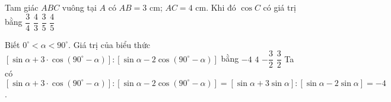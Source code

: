 \begin{ex}%
	Tam giác $ABC$ vuông tại $A$ có $AB=3$ cm; $AC=4$ cm. Khi đó $\cos C$ có giá trị bằng
	\choice
	{$\dfrac{3}{4}$}
	{$\dfrac{4}{3}$}
	{$\dfrac{3}{5}$}
	{\True $\dfrac{4}{5}$}
	\loigiai
	{ 
	}
\end{ex}

\begin{ex}%
	Biết $0^\circ< \alpha < 90^\circ$. Giá trị của biểu thức $\left[\sin \alpha +3\cdot \cos (90^\circ-\alpha)\right]:\left[\sin \alpha -2 \cos(90^\circ -\alpha)\right]$ bằng 
	\choice
	{\True $-4$}
	{$4$}
	{$-\dfrac{3}{2}$}
	{$\dfrac{3}{2}$}
	\loigiai
	{ Ta có $\left[\sin \alpha +3\cdot \cos (90^\circ-\alpha)\right]:\left[\sin \alpha -2 \cos(90^\circ -\alpha)\right]=  \left[\sin \alpha +3\sin \alpha \right]:\left[\sin \alpha -2 \sin\alpha\right] =-4$. 
	}
\end{ex}

